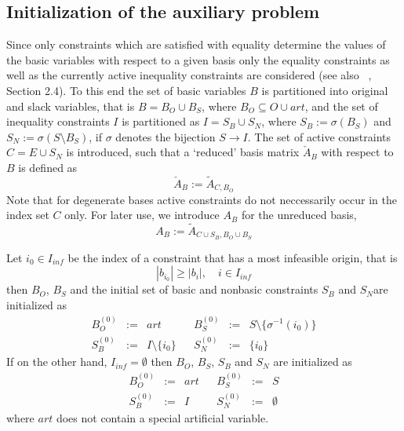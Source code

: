 \documentclass[a4paper]{article}
\begin{document}
\subsection{Initialization of the auxiliary problem}
Since only constraints which are satisfied with equality determine the values of
the basic variables with respect to a given basis only the equality constraints
as well as the currently active inequality constraints are
considered (see also ~\cite{Sven}, Section 2.4).
To this end the set of basic variables $B$ is partitioned into original and
slack variables, that is
$B=B_{O} \cup B_{S}$, where $B_O \subseteq O \cup art$,
and the set of inequality constraints $I$ is partitioned as
$I=S_{B} \cup S_{N}$, where $S_{B}:=\sigma(B_{S})$
and
$S_{N}:=\sigma(S \setminus B_{S})$, if $\sigma$ denotes the bijection
$S \rightarrow I$.
The set of active constraints
$C=E \cup S_{N}$ is
introduced, such that a `reduced' basis matrix $\check{A}_{B}$
with respect to $B$ is defined as
\begin{equation}
\label{def:red_basis_phaseI}
 \check{A}_{B}:=\tilde{A}_{C, B_{O}}
\end{equation}
Note that for degenerate bases active constraints do not neccessarily occur in
the index set $C$ only.
For later use, we introduce $A_{B}$ for the unreduced basis,
\begin{equation}
\label{def:basis_phaseI}
  A_{B}:= \tilde{A}_{C \cup S_{B}, B_{O} \cup B_{S}}
\end{equation}

Let $i_{0} \in I_{inf}$ be the index of a constraint that has a most infeasible
origin, that is 
\[
  \left| b_{i_{0}} \right| \geq  \left|b_{i}\right|, \quad i \in I_{inf}
\]
then $B_{O}$, $B_{S}$ and the initial set of basic and nonbasic constraints
$S_{B}$ and $S_{N}$are initialized as
\begin{equation}
\begin{array}{ccccccc}
  \label{def:headings_init_io}
B_{O}^{(0)} &:=& art && B_{S}^{(0)} &:=& S \setminus
  \{\sigma^{-1}\left(i_{0}\right)\} \\
S_{B}^{(0)} &:=& I \setminus \{i_{0}\} && S_{N}^{(0)} & := & \{ i_{0} \} 
\end{array}
\end{equation}
If on the other hand, $I_{inf}=\emptyset$ then $B_{O}$, $B_{S}$, $S_{B}$ and
$S_{N}$ are initialized as
\begin{equation}
\begin{array}{ccccccc}
\label{def:headings_init_fo}
B_{O}^{(0)} &:=& art && B_{S}^{(0)} &:=& S \\
S_{B}^{(0)} &:=&I && S_{N}^{(0)}&:=& \emptyset
\end{array}
\end{equation}
where $art$ does not contain a special artificial variable.
\end{document}
